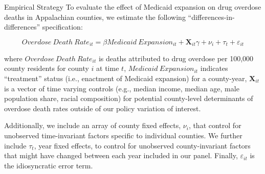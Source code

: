 \documentclass[
  ignorenonframetext,
]{beamer}
\begin{document}
\begin{frame}{Empirical Strategy}
\protect\hypertarget{empirical-strategy}{}
To evaluate the effect of Medicaid expansion on drug overdose deaths in
Appalachian counties, we estimate the following
``differences-in-differences'' specification:

\[Overdose~Death~Rate_{it} = \beta Medicaid~Expansion_{it} + \textbf{X}_{it} \gamma + \nu_{i} + \tau_{t} + \varepsilon_{it}\]

where \(Overdose~Death~Rate_{it}\) is deaths attributed to drug overdose
per 100,000 county residents for county \(i\) at time \(t\),
\(Medicaid~Expansion_{it}\) indicates ``treatment'' status (i.e.,
enactment of Medicaid expansion) for a county-year, \(\textbf{X}_{it}\)
is a vector of time varying controls (e.g., median income, median age,
male population share, racial composition) for potential county-level
determinants of overdose death rates outside of our policy variation of
interest.

Additionally, we include an array of county fixed effects, \(\nu_{i}\),
that control for unobserved time-invariant factors specific to
individual counties. We further include \(\tau_{t}\), year fixed
effects, to control for unobserved county-invariant factors that might
have changed between each year included in our panel. Finally,
\(\varepsilon_{it}\) is the idiosyncratic error term.
\end{frame}
\end{document}

